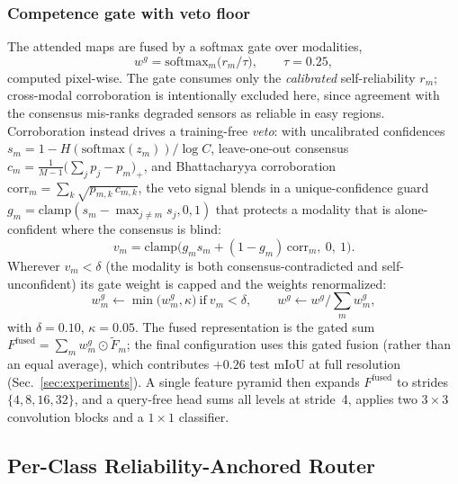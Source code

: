 \subsubsection{Competence gate with veto floor}
The attended maps are fused by a softmax gate over modalities,
\begin{equation}
w^{g} = \mathrm{softmax}_{m}\!\big(r_m/\tau\big),\qquad \tau=0.25,
\label{eq:gate}
\end{equation}
computed pixel-wise. The gate consumes only the \emph{calibrated}
self-reliability $r_m$; cross-modal corroboration is intentionally excluded
here, since agreement with the consensus mis-ranks degraded sensors as
reliable in easy regions. Corroboration instead drives a training-free
\emph{veto}: with uncalibrated confidences $s_m=1-H(\mathrm{softmax}(z_m))/\log C$,
leave-one-out consensus $c_m=\frac{1}{M-1}\big(\sum_j p_j-p_m\big)_{+}$, and
Bhattacharyya corroboration
$\mathrm{corr}_m=\sum_{k}\sqrt{p_{m,k}\,c_{m,k}}$, the veto signal blends in
a unique-confidence guard $g_m=\mathrm{clamp}(s_m-\max_{j\neq m}s_j,0,1)$
that protects a modality that is alone-confident where the consensus is
blind:
\begin{equation}
v_m = \mathrm{clamp}\big(g_m s_m + (1-g_m)\,\mathrm{corr}_m,\ 0,\ 1\big).
\label{eq:veto}
\end{equation}
Wherever $v_m<\delta$ (the modality is both consensus-contradicted and
self-unconfident) its gate weight is capped and the weights renormalized:
\begin{equation}
w^{g}_m \leftarrow \min\!\big(w^{g}_m,\kappa\big)\ \text{if}\ v_m<\delta,
\qquad
w^{g} \leftarrow w^{g}\big/\textstyle\sum_m w^{g}_m,
\label{eq:vetofloor}
\end{equation}
with $\delta=0.10$, $\kappa=0.05$. The fused representation is the gated sum
$F^{\mathrm{fused}}=\sum_m w^{g}_m\odot\tilde F_m$; the final configuration
uses this gated fusion (rather than an equal average), which contributes
$+0.26$ test mIoU at full resolution (Sec.~\ref{sec:experiments}). A single
feature pyramid then expands $F^{\mathrm{fused}}$ to strides
$\{4,8,16,32\}$, and a query-free head sums all levels at stride~4, applies
two $3{\times}3$ convolution blocks and a $1{\times}1$ classifier.

\subsection{Per-Class Reliability-Anchored Router}
\label{sec:method:router}

